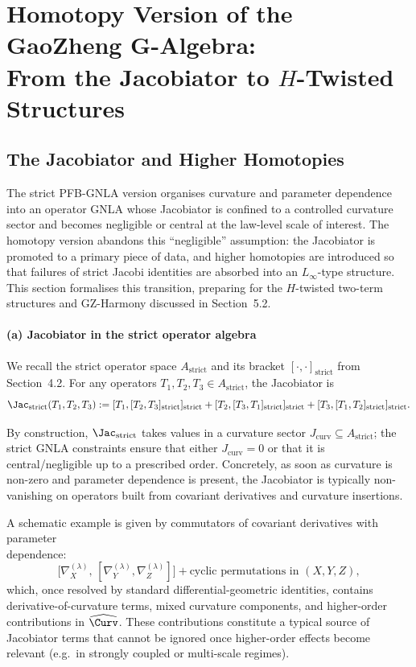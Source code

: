 \documentclass[11pt]{book}
\theoremstyle{plain}
\theoremstyle{definition}
\begin{document}
\chapter[Homotopy Version of the GaoZheng G-Algebra]{Homotopy Version of the GaoZheng G-Algebra:\\
         From the Jacobiator to \texorpdfstring{$H$}{H}-Twisted Structures}


\section{The Jacobiator and Higher Homotopies}


The strict PFB-GNLA version organises curvature and parameter
dependence into an operator GNLA whose Jacobiator is confined to a
controlled curvature sector and becomes negligible or central at the
law-level scale of interest. The homotopy version abandons this
“negligible” assumption: the Jacobiator is promoted to a primary piece
of data, and higher homotopies are introduced so that failures of
strict Jacobi identities are absorbed into an $L_\infty$-type
structure. This section formalises this transition, preparing for the
$H$-twisted two-term structures and GZ-Harmony discussed in
Section~5.2.



\subsubsection*{(a) Jacobiator in the strict operator algebra}

We recall the strict operator space
$A_{\mathrm{strict}}$ and its bracket
$[\cdot,\cdot]_{\mathrm{strict}}$ from Section~4.2. For any operators
$T_1,T_2,T_3\in A_{\mathrm{strict}}$, the Jacobiator is
\[
  \Jac_{\mathrm{strict}}(T_1,T_2,T_3)
  :=
  [T_1,[T_2,T_3]_{\mathrm{strict}}]_{\mathrm{strict}}
 +[T_2,[T_3,T_1]_{\mathrm{strict}}]_{\mathrm{strict}}
 +[T_3,[T_1,T_2]_{\mathrm{strict}}]_{\mathrm{strict}}.
\]

By construction, $\Jac_{\mathrm{strict}}$ takes values in a curvature
sector $J_{\mathrm{curv}}\subseteq A_{\mathrm{strict}}$; the strict GNLA
constraints ensure that either $J_{\mathrm{curv}}=0$ or that it is
central/negligible up to a prescribed order. Concretely, as soon as
curvature is non-zero and parameter dependence is present, the
Jacobiator is typically non-vanishing on operators built from
covariant derivatives and curvature insertions.

A schematic example is given by commutators of covariant derivatives with parameter \\ dependence:
\[
  \bigl[\nabla^{(\lambda)}_X,\,
        [\nabla^{(\lambda)}_Y,\nabla^{(\lambda)}_Z]\bigr]
 +\text{cyclic permutations in }(X,Y,Z),
\]
which, once resolved by standard differential-geometric identities,
contains \\ derivative-of-curvature terms, mixed curvature components, and
higher-order contributions in $\widehat{\Curv}$. These contributions
constitute a typical source of Jacobiator terms that cannot be ignored
once higher-order effects become relevant (e.g.\ in strongly coupled or
multi-scale regimes).
\end{document}
